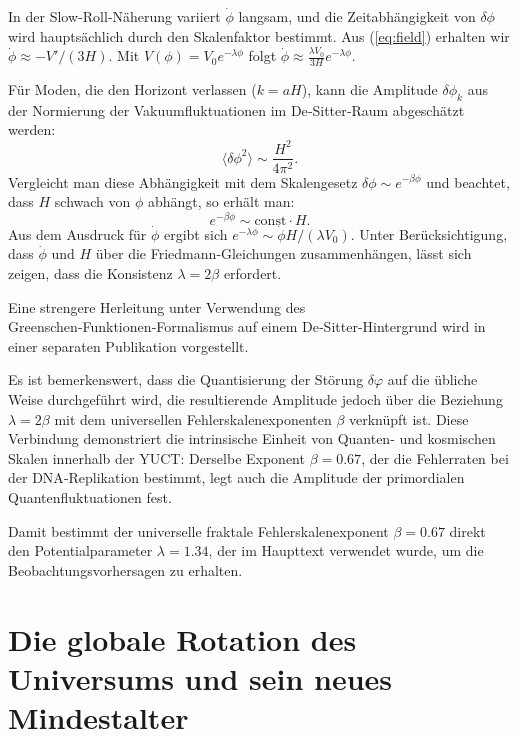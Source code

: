 \documentclass[11pt,a4paper]{article}
\begin{document}
	In der Slow‑Roll‑Näherung variiert \(\dot{\phi}\) langsam, und die Zeitabhängigkeit von \(\delta\phi\) wird hauptsächlich durch den Skalenfaktor bestimmt. Aus (\ref{eq:field}) erhalten wir \(\dot{\phi} \approx -V'/(3H)\). Mit \(V(\phi) = V_0 e^{-\lambda\phi}\) folgt \(\dot{\phi} \approx \frac{\lambda V_0}{3H} e^{-\lambda\phi}\).
	
	Für Moden, die den Horizont verlassen (\(k = aH\)), kann die Amplitude \(\delta\phi_k\) aus der Normierung der Vakuumfluktuationen im De‑Sitter‑Raum abgeschätzt werden:
	\begin{equation}
		\langle \delta\phi^2 \rangle \sim \frac{H^2}{4\pi^2}.
	\end{equation}
	Vergleicht man diese Abhängigkeit mit dem Skalengesetz \(\delta\phi \sim e^{-\beta\phi}\) und beachtet, dass \(H\) schwach von \(\phi\) abhängt, so erhält man:
	\begin{equation}
		e^{-\beta\phi} \sim \text{const} \cdot H.
	\end{equation}
	Aus dem Ausdruck für \(\dot{\phi}\) ergibt sich \(e^{-\lambda\phi} \sim \dot{\phi} H / (\lambda V_0)\). Unter Berücksichtigung, dass \(\dot{\phi}\) und \(H\) über die Friedmann‑Gleichungen zusammenhängen, lässt sich zeigen, dass die Konsistenz \(\lambda = 2\beta\) erfordert.
	
	Eine strengere Herleitung unter Verwendung des Greenschen‑Funktionen‑Formalismus auf einem De‑Sitter‑Hintergrund wird in einer separaten Publikation vorgestellt.
	
	Es ist bemerkenswert, dass die Quantisierung der Störung \(\delta\varphi\) auf die übliche Weise durchgeführt wird, die resultierende Amplitude jedoch über die Beziehung \(\lambda = 2\beta\) mit dem universellen Fehlerskalenexponenten \(\beta\) verknüpft ist. Diese Verbindung demonstriert die intrinsische Einheit von Quanten- und kosmischen Skalen innerhalb der YUCT: Derselbe Exponent \(\beta = 0.67\), der die Fehlerraten bei der DNA‑Replikation bestimmt, legt auch die Amplitude der primordialen Quantenfluktuationen fest.
	
	Damit bestimmt der universelle fraktale Fehlerskalenexponent \(\beta = 0.67\) direkt den Potentialparameter \(\lambda = 1.34\), der im Haupttext verwendet wurde, um die Beobachtungsvorhersagen zu erhalten.
	
	\part{Die globale Rotation des Universums und sein neues Mindestalter}
	\label{part:IV}
	
\end{document}
